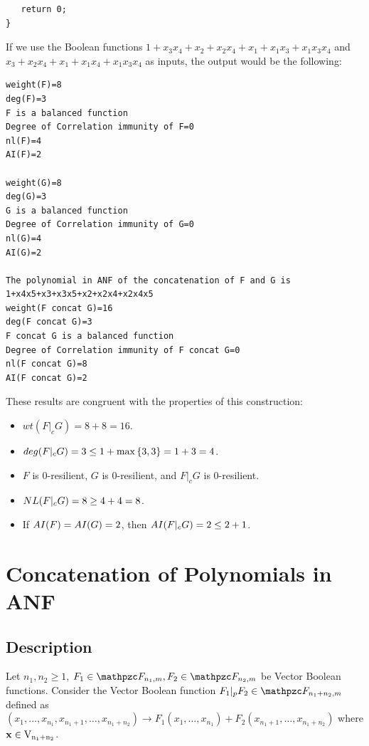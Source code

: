 \begin{example}
\begin{verbatim}
   return 0;
}
\end{verbatim}

If we use the Boolean functions $1+x_3x_4+x_2+x_2x_4+x_1+x_1x_3+x_1x_3x_4$ and $x_3+x_2x_4+x_1+x_1x_4+x_1x_3x_4$ as inputs, the output would be the following:

\begin{verbatim}
weight(F)=8
deg(F)=3
F is a balanced function
Degree of Correlation immunity of F=0
nl(F)=4
AI(F)=2

weight(G)=8
deg(G)=3
G is a balanced function
Degree of Correlation immunity of G=0
nl(G)=4
AI(G)=2

The polynomial in ANF of the concatenation of F and G is
1+x4x5+x3+x3x5+x2+x2x4+x2x4x5
weight(F concat G)=16
deg(F concat G)=3
F concat G is a balanced function
Degree of Correlation immunity of F concat G=0
nl(F concat G)=8
AI(F concat G)=2
\end{verbatim}

These results are congruent with the properties of this construction:

\begin{itemize}
\item $wt(F |_{c} G) = 8 + 8 = 16$.

\item $\crit{deg}(F |_{c} G) = 3 \leq 1 + \max \left\{ 3, 3 \right\} = 1+3=4$.

\item $F$ is $0$-resilient, $G$ is $0$-resilient, and $F |_{c}  G$ is $0$-resilient.

\item $\crit{NL}(F |_{c} G) =8 \geq 4 + 4 = 8$.

\item If $\crit{AI}(F) = \crit{AI}(G) = 2$, then $\crit{AI}(F |_{c} G) = 2 \leq 2 + 1$.

\end{itemize}
\end{example}

\section{Concatenation of Polynomials in ANF}

\subsection{Description}

\begin{definition}
Let $n_1,n_2 \geq 1$, $F_1 \in \funct{F}_{n_1,m}, F_2 \in \funct{F}_{n_2,m}$ be Vector Boolean functions. Consider the Vector Boolean function $F_1 |_{p} F_2 \in \funct{F}_{n_1+n_2,m}$ defined as $(x_1,\ldots,x_{n_1},x_{n_1+1},\ldots,x_{n_1+n_2}) \rightarrow F_1(x_1,\ldots,x_{n_1})+ F_2(x_{n_1+1},\ldots,x_{n_1+n_2})$ where $\vec{x} \in \gf{V_{n_1+n_2}}$.
\end{definition}

